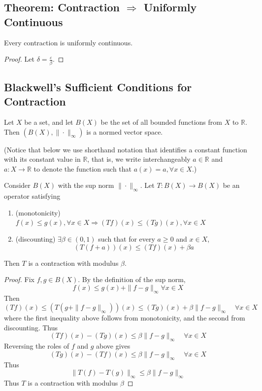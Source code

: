 \documentclass[11pt]{elegantbook}
\begin{document}
\subsection{Theorem: Contraction $\Rightarrow$ Uniformly Continuous}
\begin{theorem}
    Every contraction is uniformly continuous.
\end{theorem}
\begin{proof}
    Let $\delta=\frac{\varepsilon}{\beta}$.
\end{proof}

\subsection{Blackwell's Sufficient Conditions for Contraction}
Let $X$ be a set, and let $B(X)$ be the set of all bounded functions from $X$ to $\mathbb{R}$. Then $(B(X), \|\cdot\|_\infty)$ is a normed vector space.

(Notice that below we use shorthand notation that identifies a constant function with its constant value in $\mathbb{R}$, that is, we write interchangeably $a \in \mathbb{R}$ and $a : X \rightarrow \mathbb{R}$ to denote the function such that $a(x) = a, \forall x \in X$.)

\begin{theorem}
    Consider $B(X)$ with the sup norm $\|\cdot\|_\infty$. Let $T : B(X) \rightarrow B(X)$ be an operator satisfying
    \begin{enumerate}
        \item (monotonicity) $f(x) \leq g(x), \forall x\in X \Rightarrow (T f)(x) \leq (T g)(x), \forall x \in X$
        \item (discounting) $\exists \beta \in (0, 1)$ such that for every $a \geq 0$ and $x \in X$, $$(T (f + a)) (x) \leq (T f)(x) + \beta a$$
    \end{enumerate}
    Then $T$ is a contraction with modulus $\beta$.
\end{theorem}
\begin{proof}
    Fix $f, g \in B(X)$. By the definition of the sup norm,
    $$
    f(x) \leq g(x)+\|f-g\|_{\infty} \forall x \in X
    $$
    Then
    $$
    (T f)(x) \leq\left(T\left(g+\|f-g\|_{\infty}\right)\right)(x) \leq(T g)(x)+\beta\|f-g\|_{\infty} \quad \forall x \in X
    $$
    where the first inequality above follows from monotonicity, and the second from discounting. Thus
    $$
    (T f)(x)-(T g)(x) \leq \beta\|f-g\|_{\infty} \quad \forall x \in X
    $$
    Reversing the roles of $f$ and $g$ above gives
    $$
    (T g)(x)-(T f)(x) \leq \beta\|f-g\|_{\infty} \quad \forall x \in X
    $$
    Thus
    $$
    \|T(f)-T(g)\|_{\infty} \leq \beta\|f-g\|_{\infty}
    $$
    Thus $T$ is a contraction with modulus $\beta$
\end{proof}
\end{document}
